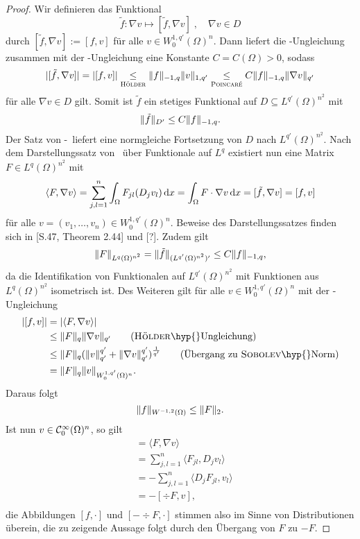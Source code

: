 \begin{proof}
  Wir definieren das Funktional
  $$
  \tilde f \colon \nabla v \mapsto [\tilde f, \nabla v]\;, \quad \nabla v \in D
  $$
  durch $[\tilde f, \nabla v] := [f, v]$ für alle $v \in W_0^{1,q'}(\Omega)^n$.
  Dann liefert die \hoelder\hyp{}Ungleichung zusammen mit der \poincare\hyp{}Ungleichung eine Konstante $C = C(\Omega) > 0$, sodass 
  $$
  |[\tilde f, \nabla v]| 
  = |[f, v]| 
  \underset{\hoelder}{\leq} \norm{f}_{-1,q} \norm{v}_{1,q'}
  \underset{\poincare}{\leq} C \norm{f}_{-1,q} \norm{\nabla v }_{q'}
  $$
  für alle $\nabla v \in D$ gilt.
  Somit ist $\tilde f$ ein stetiges Funktional auf $D \subseteq L^{q'}(\Omega)^{n^2}$ mit 
  $$\norm{\tilde f}_{D'} \leq C\norm{f}_{-1,q}.$$
  Der Satz von \hahn\hyp{}\banach\ liefert eine normgleiche Fortsetzung von $D$ nach $L^{q'}(\Omega)^{n^2}$.
  Nach dem Darstellungssatz von \riesz\ über Funktionale auf $L^{q}$  existiert nun eine Matrix $F \in L^{q}(\Omega)^{n^2}$ mit
  $$
  \langle F, \nabla v \rangle
  = \sum_{j,l=1}^n \int_\Omega F_{jl}(D_j v_l) \d x
  = \int_\Omega F \cdot \nabla v \d x
  = [\tilde f, \nabla v] 
  = [f, v]
  $$
  für alle $v = (v_1,\dots,v_n) \in W_0^{1,q'}(\Omega)^n$.
  Beweise des Darstellungssatzes finden sich in \cite{adams2003sobolev}[S.47, Theorem 2.44] und \cite{werner2011fa}[?].
  Zudem gilt
  $$ \norm{F}_{L^q(\Omega)^{n^2}} = \norm{\tilde f}_{(L^{q'}(\Omega)^{n^2})'} \leq C \norm{f}_{-1,q},$$
  da die Identifikation von Funktionalen auf $L^{q'}(\Omega)^{n^2}$ mit Funktionen aus $L^q(\Omega)^{n^2}$ isometrisch ist.
  Des Weiteren gilt für alle $v \in W_0^{1,q'}(\Omega)^n$ mit der \hoelder\hyp{}Ungleichung
  \begin{align*}
    |[f,v]| 
    &= |\langle F, \nabla v\rangle|  \\
    &\leq \norm{F}_q \norm{\nabla v}_{q'}  \tag{\hoelder\hyp{}Ungleichung}\\
    &\leq \norm{F}_q (\norm{v}_{q'}^{q'} + \norm{\nabla v}_{q'}^{q'})^{\frac{1}{q'}} \tag{Übergang zu \sobolev\hyp{}Norm}\\
    &= \norm{F}_q \norm{v}_{W_0^{1,q'}(\Omega)^n}.
  \end{align*}
  Daraus folgt
  $$
  \norm{f}_{W^{-1,2}(\Omega)} \leq \norm{F}_2.
  $$
  Ist nun $v \in \C_0^\infty(\Omega)^n$, so gilt
  \begin{align*}
    [f,v]
    &= \langle F, \nabla v\rangle \\
    &= \sum_{j,l=1}^n \langle F_{jl}, D_j v_l \rangle \\
    &= -\sum_{j,l=1}^n \langle D_j F_{jl}, v_l \rangle \\
    &= -[\div F, v], \\
  \end{align*}
  die Abbildungen $[f,\cdot]$ und $[-\div F, \cdot]$ stimmen also im Sinne von Distributionen überein, die zu zeigende Aussage folgt durch den Übergang von $F$ zu $-F$.
\end{proof}

